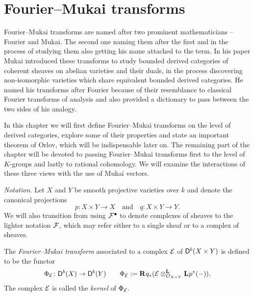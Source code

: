 \section{Fourier--Mukai transforms}
\label{Chapter: Fourier-Mukai transforms}

Fourier--Mukai transforms are named after two prominent mathematicians -- Fourier and Mukai. The second one naming them after the first and in the process of studying them also getting his name attached to the term. In his paper \cite{Mukai1981} Mukai introduced these transforms to study bounded derived categories of coherent sheaves on abelian varieties and their duals, in the process discovering non-isomorphic varieties which share equivalent bounded derived categories. He named his transforms after Fourier because of their resemblance to classical Fourier transforms of analysis and also provided a dictionary to pass between the two sides of his analogy.

In this chapter we will first define Fourier--Mukai transforms on the level of derived categories, explore some of their properties and state an important theorem of Orlov, which will be indispensable later on. The remaining part of the chapter will be devoted to passing Fourier--Mukai transforms first to the level of $K$-groups and lastly to rational cohomology. We will examine the interactions of these three views with the use of Mukai vectors.

\noindent
\textsl{Notation.}
Let $X$ and $Y$ be smooth projective varieties over $k$ and denote the canonical projections 
\[
    p \colon X \times Y \to X \quad \text{and} \quad q \colon X \times Y \to Y.
\]
We will also transition from using $\F^\bullet$ to denote complexes of sheaves to the lighter notation $\F$, which may refer either to a single sheaf or to a complex of sheaves.

\begin{definition}
    The \emph{Fourier--Mukai transform} associated to a complex $\E$ of $\derb{X \times Y}$ is defined to be the functor
    \[
        \fm{\E} \colon \derb{X} \to \derb{Y} \qquad \fm{\E} := \rderived{}{q_*}(\derivedtensor{\E}{\lderived{}{p^*}(-)}{\struct{X \times Y}}).
    \]
    The complex $\E$ is called the \emph{kernel} of $\fm{\E}$.
\end{definition}

